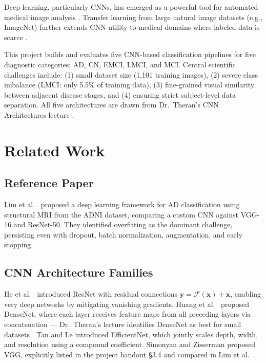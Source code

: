 \documentclass[12pt, a4paper]{article}
\begin{document}
Deep learning, particularly CNNs, has emerged as a powerful
tool for automated medical image analysis \cite{litjens2017}.
Transfer learning from large natural image datasets (e.g.,
ImageNet) further extends CNN utility to medical domains where
labeled data is scarce \cite{tajbakhsh2016}.

This project builds and evaluates five CNN-based
classification pipelines for five diagnostic categories: AD,
CN, EMCI, LMCI, and MCI. Central scientific challenges
include: (1) small dataset size (1,101 training images),
(2) severe class imbalance (LMCI: only 5.5\% of training
data), (3) fine-grained visual similarity between adjacent
disease stages, and (4) ensuring strict subject-level data
separation. All five architectures are drawn from
Dr.\ Theran's CNN Architectures lecture \cite{theran2026cnn}.

\section{Related Work}

\subsection{Reference Paper}
Lim et al.\ \cite{lim2022} proposed a deep learning framework
for AD classification using structural MRI from the ADNI
dataset, comparing a custom CNN against VGG-16 and ResNet-50.
They identified overfitting as the dominant challenge,
persisting even with dropout, batch normalization,
augmentation, and early stopping.

\subsection{CNN Architecture Families}
He et al.\ \cite{he2016} introduced ResNet with residual
connections $\mathbf{y} = \mathcal{F}(\mathbf{x}) +
\mathbf{x}$, enabling very deep networks by mitigating
vanishing gradients. Huang et al.\ \cite{huang2017} proposed
DenseNet, where each layer receives feature maps from all
preceding layers via concatenation --- Dr.\ Theran's lecture
identifies DenseNet as best for small datasets
\cite{theran2026cnn}. Tan and Le \cite{tan2019} introduced
EfficientNet, which jointly scales depth, width, and
resolution using a compound coefficient. Simonyan and
Zisserman \cite{simonyan2014} proposed VGG, explicitly listed
in the project handout \S3.4 and compared in Lim et al.\
\cite{lim2022}.
\end{document}

